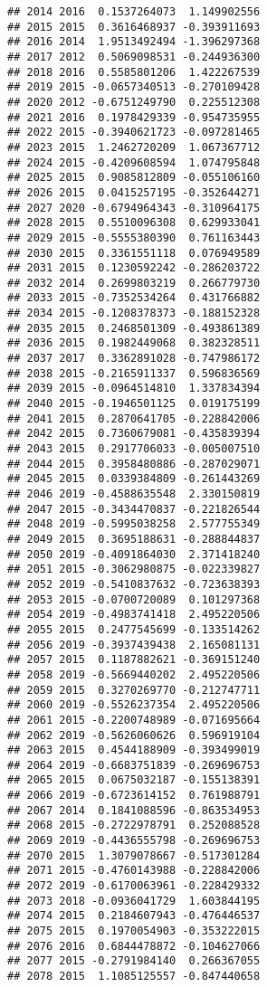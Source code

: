 \documentclass[
]{article}
\begin{document}
\begin{verbatim}
## 2014 2016  0.1537264073  1.149902556
## 2015 2015  0.3616468937 -0.393911693
## 2016 2014  1.9513492494 -1.396297368
## 2017 2012  0.5069098531 -0.244936300
## 2018 2016  0.5585801206  1.422267539
## 2019 2015 -0.0657340513 -0.270109428
## 2020 2012 -0.6751249790  0.225512308
## 2021 2016  0.1978429339 -0.954735955
## 2022 2015 -0.3940621723 -0.097281465
## 2023 2015  1.2462720209  1.067367712
## 2024 2015 -0.4209608594  1.074795848
## 2025 2015  0.9085812809 -0.055106160
## 2026 2015  0.0415257195 -0.352644271
## 2027 2020 -0.6794964343 -0.310964175
## 2028 2015  0.5510096308  0.629933041
## 2029 2015 -0.5555380390  0.761163443
## 2030 2015  0.3361551118  0.076949589
## 2031 2015  0.1230592242 -0.286203722
## 2032 2014  0.2699803219  0.266779730
## 2033 2015 -0.7352534264  0.431766882
## 2034 2015 -0.1208378373 -0.188152328
## 2035 2015  0.2468501309 -0.493861389
## 2036 2015  0.1982449068  0.382328511
## 2037 2017  0.3362891028 -0.747986172
## 2038 2015 -0.2165911337  0.596836569
## 2039 2015 -0.0964514810  1.337834394
## 2040 2015 -0.1946501125  0.019175199
## 2041 2015  0.2870641705 -0.228842006
## 2042 2015  0.7360679081 -0.435839394
## 2043 2015  0.2917706033 -0.005007510
## 2044 2015  0.3958480886 -0.287029071
## 2045 2015  0.0339384809 -0.261443269
## 2046 2019 -0.4588635548  2.330150819
## 2047 2015 -0.3434470837 -0.221826544
## 2048 2019 -0.5995038258  2.577755349
## 2049 2015  0.3695188631 -0.288844837
## 2050 2019 -0.4091864030  2.371418240
## 2051 2015 -0.3062980875 -0.022339827
## 2052 2019 -0.5410837632 -0.723638393
## 2053 2015 -0.0700720089  0.101297368
## 2054 2019 -0.4983741418  2.495220506
## 2055 2015  0.2477545699 -0.133514262
## 2056 2019 -0.3937439438  2.165081131
## 2057 2015  0.1187882621 -0.369151240
## 2058 2019 -0.5669440202  2.495220506
## 2059 2015  0.3270269770 -0.212747711
## 2060 2019 -0.5526237354  2.495220506
## 2061 2015 -0.2200748989 -0.071695664
## 2062 2019 -0.5626060626  0.596919104
## 2063 2015  0.4544188909 -0.393499019
## 2064 2019 -0.6683751839 -0.269696753
## 2065 2015  0.0675032187 -0.155138391
## 2066 2019 -0.6723614152  0.761988791
## 2067 2014  0.1841088596 -0.863534953
## 2068 2015 -0.2722978791  0.252088528
## 2069 2019 -0.4436555798 -0.269696753
## 2070 2015  1.3079078667 -0.517301284
## 2071 2015 -0.4760143988 -0.228842006
## 2072 2019 -0.6170063961 -0.228429332
## 2073 2018 -0.0936041729  1.603844195
## 2074 2015  0.2184607943 -0.476446537
## 2075 2015  0.1970054903 -0.353222015
## 2076 2016  0.6844478872 -0.104627066
## 2077 2015 -0.2791984140  0.266367055
## 2078 2015  1.1085125557 -0.847440658

\end{verbatim}
\end{document}
